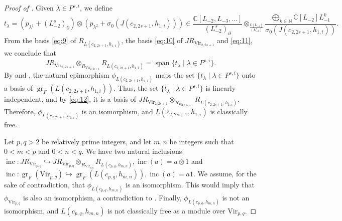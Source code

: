 \documentclass[a4paper, 12pt, reqno]{amsart}
\theoremstyle{remark}
\DeclareMathOperator{\gr}{gr}
\DeclareMathOperator{\vspan}{span}
\DeclareMathOperator{\inc}{inc}
\newcommand{\Vir}{{\mathrm{Vir}}}
\begin{document}
\begin{proof}[Proof of ]
  Given $\lambda \in P^{s, i}$, we define
  \begin{equation*}
    t_\lambda = (p_{\lambda^1} + (L_{-2}^s)_\partial)\otimes(p_{\lambda^2} + \sigma_0(J(c_{2, 2s + 1}, h_{1, i}))) \in \frac{\mathbb{C}[L_{-2}, L_{-3}, \dots]}{(L_{-2}^s)_\partial} \otimes_{\frac{\mathbb{C}[L_{-2}]}{(L_{-2}^s)}} \frac{\bigoplus_{k \in \mathbb{N}}\mathbb{C}[L_{-2}]L_{-1}^k}{\sigma_0(J(c_{2, 2s + 1}, h_{1, i}))}.
  \end{equation*}
  From the basis \eqref{eq:9} of $R_{L(c_{2, 2s + 1}, h_{1, i})}$, the basis \eqref{eq:10} of $JR_{\Vir_{2, 2s + 1}}$ and \eqref{eq:11}, we conclude that
  \begin{equation}
    \label{eq:12}
    JR_{\Vir_{2, 2s + 1}} \otimes_{R_{\Vir_{2, 2s + 1}}} R_{L(c_{2, 2s + 1}, h_{1, i})} = \vspan\{t_\lambda \mid \lambda \in P^{s, i}\}.
  \end{equation}
  By  and , the natural epimorphism $\phi_{L(c_{2, 2s + 1}, h_{1, i})}$ maps the set $\{t_\lambda \mid \lambda \in P^{s, i}\}$ onto a basis of $\gr_F(L(c_{2, 2s + 1}, h_{1, i}))$.
  Thus, the set $\{t_\lambda \mid \lambda \in P^{s, i}\}$ is linearly independent, and by \eqref{eq:12}, it is a basis of $JR_{\Vir_{2, 2s + 1}} \otimes_{R_{\Vir_{2, 2s + 1}}} R_{L(c_{2, 2s + 1}, h_{1, i})}$.
  Therefore, $\phi_{L(c_{2, 2s + 1}, h_{1, i})}$ is an isomorphism, and $L(c_{2, 2s + 1}, h_{1, i})$ is classically free.

  Let $p, q > 2$ be relatively prime integers, and let $m, n$ be integers such that $0 < m < p$ and $0 < n < q$.
  We have two natural inclusions $\inc: JR_{\Vir_{p, q}} \hookrightarrow JR_{\Vir_{p, q}} \otimes_{R_{\Vir_{p, q}}} R_{L(c_{p, q}, h_{m, n})}, \inc(a) = a\otimes1$ and $\inc: \gr_F(\Vir_{p, q}) \hookrightarrow \gr_F(L(c_{p, q}, h_{m, n})), \inc(a) = a1$.
  We assume, for the sake of contradiction, that $\phi_{L(c_{p, q}, h_{m, n})}$ is an isomorphism.
  This would imply that $\phi_{\Vir_{p, q}}$ is also an isomorphism, a contradiction to .
  Finally, $\phi_{L(c_{p, q}, h_{m, n})}$ is not an isomorphism, and $L(c_{p, q}, h_{m, n})$ is not classically free as a module over $\Vir_{p, q}$.
\end{proof}
\end{document}

